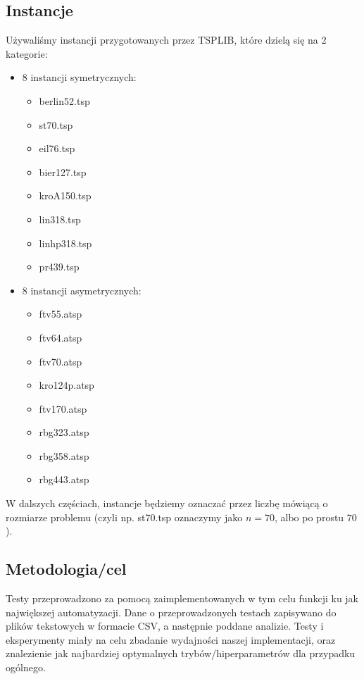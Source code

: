 \documentclass{article}
\begin{document}
\subsection{Instancje}
Używaliśmy instancji przygotowanych przez TSPLIB, które dzielą się na 2 kategorie:
\begin{itemize}
	\item 8 instancji symetrycznych:
		\begin{itemize}
			\item berlin52.tsp
			\item st70.tsp
			\item eil76.tsp
			\item bier127.tsp
			\item kroA150.tsp
			\item lin318.tsp
			\item linhp318.tsp
			\item pr439.tsp
		\end{itemize}
	\item 8 instancji asymetrycznych:
		\begin{itemize}
			\item ftv55.atsp
			\item ftv64.atsp
			\item ftv70.atsp
			\item kro124p.atsp
			\item ftv170.atsp
			\item rbg323.atsp
			\item rbg358.atsp
			\item rbg443.atsp
		\end{itemize}
\end{itemize}

W dalszych częściach, instancje będziemy oznaczać przez liczbę mówiącą o rozmiarze problemu (czyli np. st70.tsp oznaczymy jako $n = 70$, albo po prostu $70$).

\subsection{Metodologia/cel}

Testy przeprowadzono za pomocą zaimplementowanych w tym celu funkcji ku jak największej automatyzacji. Dane o przeprowadzonych testach zapisywano do plików tekstowych w formacie CSV, a następnie poddane analizie. Testy i eksperymenty miały na celu zbadanie wydajności naszej implementacji, oraz znalezienie jak najbardziej optymalnych trybów/hiperparametrów dla przypadku ogólnego.
\end{document}
